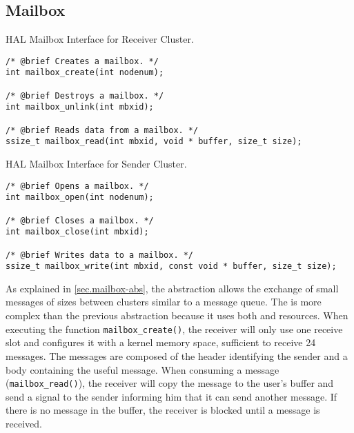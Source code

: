 	\subsection{Mailbox}

\begin{listing}[t]
\caption{HAL Mailbox Interface for Receiver Cluster.}
\label{code:mailbox-receiver}
\begin{verbatim}
/* @brief Creates a mailbox. */
int mailbox_create(int nodenum);

/* @brief Destroys a mailbox. */
int mailbox_unlink(int mbxid);

/* @brief Reads data from a mailbox. */
ssize_t mailbox_read(int mbxid, void * buffer, size_t size);
\end{verbatim}
\end{listing}

\begin{listing}[t]
\caption{HAL Mailbox Interface for Sender Cluster.}
\label{code:mailbox-sender}
\begin{verbatim}
/* @brief Opens a mailbox. */
int mailbox_open(int nodenum);

/* @brief Closes a mailbox. */
int mailbox_close(int mbxid);

/* @brief Writes data to a mailbox. */
ssize_t mailbox_write(int mbxid, const void * buffer, size_t size);
\end{verbatim}
\end{listing}

		As explained in \autoref{sec.mailbox-abs}, the \mailbox abstraction
		allows the exchange of small messages of sizes between clusters similar
		to a \posix message queue.
		The \mailbox is more complex than the previous abstraction because it
		uses both \dnoc and \cnoc resources.
		When executing the function \texttt{mailbox\_create()}, the receiver
		will only use one \dnoc receive slot and configures it with a kernel
		memory space, sufficient to receive 24 messages.
		The messages are composed of the header identifying the sender
		and a body containing the useful message.
		When consuming a message (\texttt{mailbox\_read()}), the receiver
		will copy the message to the user's buffer and send a signal
		to the sender informing him that it can send another message.
		If there is no message in the buffer, the receiver is blocked
		until a message is received.

